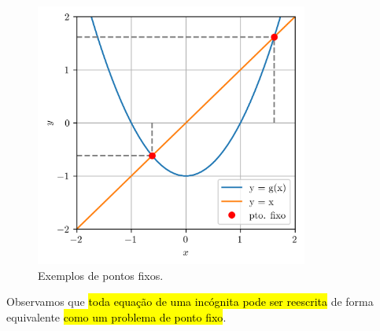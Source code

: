 \begin{figure}[H]
  \centering
  \includegraphics[width=0.8\textwidth]{./cap_eq1d/dados/fig_pfixo/fig}
  \caption{Exemplos de pontos fixos.}
  \label{cap_eq1d_sec_pfixo:fig:pfixo}
\end{figure}

Observamos que \hl{toda equação de uma incógnita pode ser reescrita} de forma equivalente \hl{como um problema de ponto fixo}.

